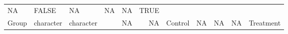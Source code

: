 \documentclass[
]{article}
\begin{document}
\begin{longtable}[]{@{}lllrrrlrrrl@{}}
\begin{minipage}[t]{0.05\columnwidth}
NA\strut
\end{minipage} & \begin{minipage}[t]{0.07\columnwidth}\raggedright
FALSE\strut
\end{minipage} & \begin{minipage}[t]{0.05\columnwidth}\raggedleft
NA\strut
\end{minipage} & \begin{minipage}[t]{0.05\columnwidth}\raggedleft
NA\strut
\end{minipage} & \begin{minipage}[t]{0.05\columnwidth}\raggedleft
NA\strut
\end{minipage} & \begin{minipage}[t]{0.06\columnwidth}\raggedright
TRUE\strut
\end{minipage}\tabularnewline
\begin{minipage}[t]{0.10\columnwidth}\raggedright
Group\strut
\end{minipage} & \begin{minipage}[t]{0.07\columnwidth}\raggedright
character\strut
\end{minipage} & \begin{minipage}[t]{0.06\columnwidth}\raggedright
character\strut
\end{minipage} & \begin{minipage}[t]{0.08\columnwidth}\raggedleft
250\strut
\end{minipage} & \begin{minipage}[t]{0.06\columnwidth}\raggedleft
NA\strut
\end{minipage} & \begin{minipage}[t]{0.05\columnwidth}\raggedleft
NA\strut
\end{minipage} & \begin{minipage}[t]{0.07\columnwidth}\raggedright
Control\strut
\end{minipage} & \begin{minipage}[t]{0.05\columnwidth}\raggedleft
NA\strut
\end{minipage} & \begin{minipage}[t]{0.05\columnwidth}\raggedleft
NA\strut
\end{minipage} & \begin{minipage}[t]{0.05\columnwidth}\raggedleft
NA\strut
\end{minipage} & \begin{minipage}[t]{0.06\columnwidth}\raggedright
Treatment\strut
\end{minipage}\tabularnewline

\end{longtable}
\end{document}
